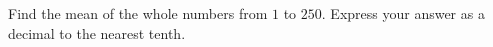 Find the mean of the whole numbers from $1$ to $250$. Express your answer as a decimal to the nearest tenth.
